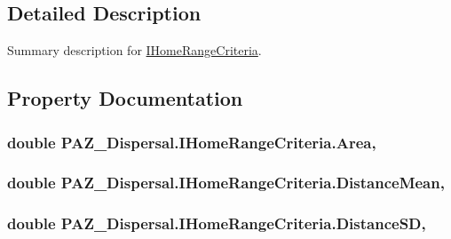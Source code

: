 \subsection{Detailed Description}
Summary description for \hyperlink{interface_p_a_z___dispersal_1_1_i_home_range_criteria}{I\-Home\-Range\-Criteria}. 



\subsection{Property Documentation}
\hypertarget{interface_p_a_z___dispersal_1_1_i_home_range_criteria_a963667778e9f47bbd9e224bf45baa95d}{
\subsubsection[{Area}]{\setlength{\rightskip}{0pt plus 5cm}double P\-A\-Z\-\_\-\-Dispersal.\-I\-Home\-Range\-Criteria.\-Area\hspace{0.3cm}{\ttfamily [get]}, {\ttfamily [set]}}}\label{interface_p_a_z___dispersal_1_1_i_home_range_criteria_a963667778e9f47bbd9e224bf45baa95d}
\hypertarget{interface_p_a_z___dispersal_1_1_i_home_range_criteria_a0109f85283b25b0de64066555b35f1cb}{
\subsubsection[{Distance\-Mean}]{\setlength{\rightskip}{0pt plus 5cm}double P\-A\-Z\-\_\-\-Dispersal.\-I\-Home\-Range\-Criteria.\-Distance\-Mean\hspace{0.3cm}{\ttfamily [get]}, {\ttfamily [set]}}}\label{interface_p_a_z___dispersal_1_1_i_home_range_criteria_a0109f85283b25b0de64066555b35f1cb}
\hypertarget{interface_p_a_z___dispersal_1_1_i_home_range_criteria_adf9eccf2118ee525a08456765214edd6}{
\subsubsection[{Distance\-S\-D}]{\setlength{\rightskip}{0pt plus 5cm}double P\-A\-Z\-\_\-\-Dispersal.\-I\-Home\-Range\-Criteria.\-Distance\-S\-D\hspace{0.3cm}{\ttfamily [get]}, {\ttfamily [set]}}}\label{interface_p_a_z___dispersal_1_1_i_home_range_criteria_adf9eccf2118ee525a08456765214edd6}
